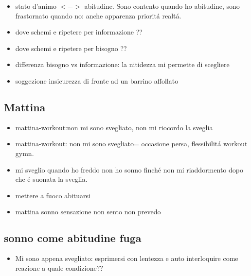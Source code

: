 \begin{itemize}

\item stato d'animo $<->$ abitudine. Sono contento quando ho abitudine, sono frastornato quando no: anche apparenza priorit\'a realt\'a.

\item dove schemi e ripetere per informazione ??

\item dove schemi e ripetere per bisogno ??

\item differenza bisogno vs informazione: la nitidezza mi permette di scegliere

\item soggezione insicurezza di fronte ad un barrino affollato

\end{itemize}


\subsection{Mattina}

\begin{itemize}

\item mattina-workout:non mi sono svegliato, non mi riocordo la sveglia

\item mattina-workout: non mi sono svegliato= occasione persa, flessibilit\'a workout gymn.

\item mi sveglio quando ho freddo non ho sonno finch\'e non mi riaddormento dopo che \'e suonata la sveglia.

\item mettere a fuoco abituarsi

\item mattina sonno sensazione non sento non prevedo

\end{itemize}

\subsection{sonno come abitudine fuga}

\begin{itemize}

\item Mi sono appena svegliato: esprimersi con lentezza e auto interloquire come reazione a quale condizione??

\end{itemize}



